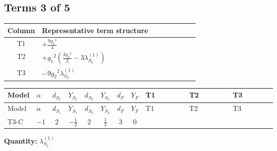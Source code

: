 \documentclass[8pt]{article}
\begin{document}
\begin{landscape}
\subsection*{Terms 3 of 5}
\begin{center}
\begin{tabular}{@{}c >{\raggedright\arraybackslash}p{0.82\linewidth}@{}}
\toprule
Column & Representative term structure \\
\midrule
T1 & \(\displaystyle +\frac{9 {g_2}^4}{4}\) \\
\midrule
T2 & \(\displaystyle +{g_1}^2 \left(\frac{3 {g_2}^2}{2}-3 {\lambda_{S_2}^{(1)}}\right)\) \\
\midrule
T3 & \(\displaystyle -9 {g_2}^2 {\lambda_{S_2}^{(1)}}\) \\
\midrule
\bottomrule
\end{tabular}
\end{center}
\smallskip
\tiny
\begin{longtable}{@{}llcccccc >{\raggedright\arraybackslash}p{0.21\linewidth} >{\raggedright\arraybackslash}p{0.21\linewidth} >{\raggedright\arraybackslash}p{0.21\linewidth}@{}}
\toprule
Model & $\alpha$ & $d_{S_1}$ & $Y_{S_1}$ & $d_{S_2}$ & $Y_{S_2}$ & $d_F$ & $Y_F$ & T1 & T2 & T3 \\
\midrule
\endfirsthead
\toprule
Model & $\alpha$ & $d_{S_1}$ & $Y_{S_1}$ & $d_{S_2}$ & $Y_{S_2}$ & $d_F$ & $Y_F$ & T1 & T2 & T3 \\
\midrule
\endhead
T3-C & $-1$ & $2$ & $-\frac{1}{2}$ & $2$ & $\frac{1}{2}$ & $3$ & $0$ & \scriptsize\adjustbox{max width=\linewidth}{$\begin{gathered} +\frac{9 {g_2}^4}{4}\end{gathered}$} & \scriptsize\adjustbox{max width=\linewidth}{$\begin{gathered} +{g_1}^2 \left(\frac{3 {g_2}^2}{2}-3 {\lambda_{S_2}^{(1)}}\right)\end{gathered}$} & \scriptsize\adjustbox{max width=\linewidth}{$\begin{gathered} -9 {g_2}^2 {\lambda_{S_2}^{(1)}}\end{gathered}$} \\
\midrule
\bottomrule
\end{longtable}
\clearpage
\noindent\textbf{Quantity: }$\lambda_{S_2}^{(1)}$\par\smallskip

\end{landscape}
\end{document}

